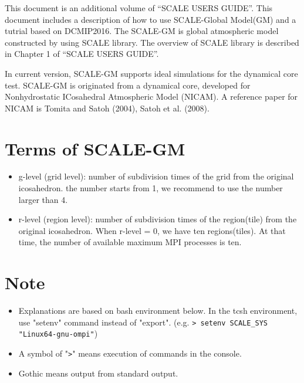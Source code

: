 
This document is an additional volume of ``SCALE USERS GUIDE''.
This document includes a description of how to use SCALE-Global Model(GM) and a tutrial based on DCMIP2016.
The SCALE-GM is global atmospheric model constructed by using SCALE library.
The overview of SCALE library is described in Chapter 1 of ``SCALE USERS GUIDE''.

In current version, SCALE-GM supports ideal simulations for the dynamical core test.
SCALE-GM is originated from a dynamical core, developed for Nonhydrostatic ICosahedral Atmospheric Model (NICAM).
A reference paper for NICAM is
Tomita and Satoh (2004), Satoh et al. (2008).

\section{Terms of SCALE-GM}

 \begin{itemize}
   \item g-level (grid level): number of subdivision times of the grid from the original icosahedron.
         the number starts from 1, we recommend to use the number larger than 4.
   \item r-level (region level): number of subdivision times of the region(tile)
         from the original icosahedron. When r-level = 0, we have ten regions(tiles).
         At that time, the number of available maximum MPI processes is ten.
 \end{itemize}


\section{Note}
 \begin{itemize}
   \item Explanations are based on bash environment below.
         In the tcsh environment, use "setenv" command instead of "export".
         (e.g. \verb|> setenv SCALE_SYS "Linux64-gnu-ompi"|)
   \item A symbol of "\verb|>|" means execution of commands in the console.
   \item Gothic means output from standard output.
 \end{itemize}

